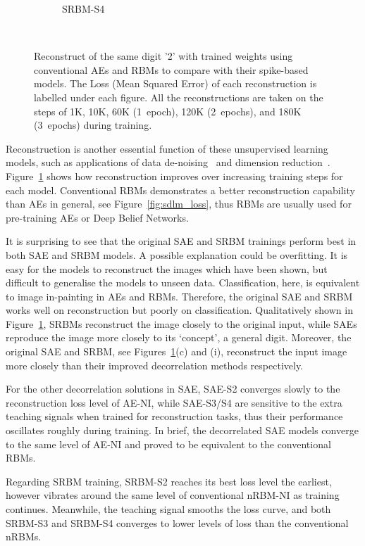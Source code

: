 \begin{figure}
\begin{subfigure}[t]{0.32\textwidth}
		\caption{SRBM-S4}
	\end{subfigure}\\
	\caption[Reconstructions of the same digit '2'.]{Reconstruct of the same digit '2' with trained weights using conventional AEs and RBMs to compare with their spike-based models.
		The Loss (Mean Squared Error) of each reconstruction is labelled under each figure.
		All the reconstructions are taken on the steps of 1K, 10K, 60K (1~epoch), 120K (2~epochs), and 180K (3~epochs) during training.}
	\label{fig:sdlm_recon}
\end{figure}

Reconstruction is another essential function of these unsupervised learning models, such as applications of data de-noising~\citep{xie2012image} and dimension reduction~\citep{hinton2006fast}.
Figure~\ref{fig:sdlm_recon} shows how reconstruction improves over increasing training steps for each model.
Conventional RBMs demonstrates a better reconstruction capability than AEs in general, see Figure~\ref{fig:sdlm_loss}, thus RBMs are usually used for pre-training AEs or Deep Belief Networks.

It is surprising to see that the original SAE and SRBM trainings perform best in both SAE and SRBM models.
A possible explanation could be overfitting.
It is easy for the models to reconstruct the images which have been shown, but difficult to generalise the models to unseen data.
Classification, here, is equivalent to image in-painting in AEs and RBMs.
Therefore, the original SAE and SRBM works well on reconstruction but poorly on classification.
Qualitatively shown in Figure~\ref{fig:sdlm_recon}, SRBMs reconstruct the image closely to the original input, while SAEs reproduce the image more closely to its `concept', a general digit.
Moreover, the original SAE and SRBM, see Figures~\ref{fig:sdlm_recon}(c) and (i), reconstruct the input image more closely than their improved decorrelation methods respectively.

For the other decorrelation solutions in SAE, 
SAE-S2 converges slowly to the reconstruction loss level of AE-NI, 
while SAE-S3/S4 are sensitive to the extra teaching signals when trained for reconstruction tasks, thus their performance oscillates roughly during training.
In brief, the decorrelated SAE models converge to the same level of AE-NI and proved to be equivalent to the conventional RBMs.

Regarding SRBM training, SRBM-S2 reaches its best loss level the earliest, however vibrates around the same level of conventional nRBM-NI as training continues.
Meanwhile, the teaching signal smooths the loss curve, and both SRBM-S3 and SRBM-S4 converges to lower levels of loss than the conventional nRBMs.

